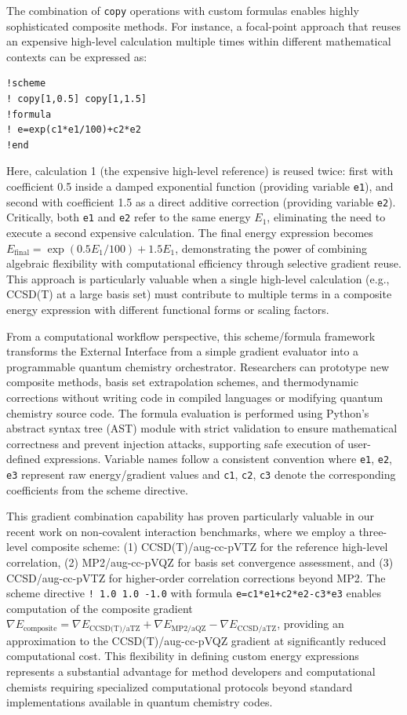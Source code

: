 The combination of \texttt{copy} operations with custom formulas enables highly sophisticated composite methods. For instance, a focal-point approach that reuses an expensive high-level calculation multiple times within different mathematical contexts can be expressed as:
\begin{verbatim}
!scheme
! copy[1,0.5] copy[1,1.5]
!formula
! e=exp(c1*e1/100)+c2*e2
!end
\end{verbatim}
Here, calculation 1 (the expensive high-level reference) is reused twice: first with coefficient 0.5 inside a damped exponential function (providing variable \texttt{e1}), and second with coefficient 1.5 as a direct additive correction (providing variable \texttt{e2}). Critically, both \texttt{e1} and \texttt{e2} refer to the same energy $E_1$, eliminating the need to execute a second expensive calculation. The final energy expression becomes $E_{\text{final}} = \exp(0.5 E_1 / 100) + 1.5 E_1$, demonstrating the power of combining algebraic flexibility with computational efficiency through selective gradient reuse. This approach is particularly valuable when a single high-level calculation (e.g., CCSD(T) at a large basis set) must contribute to multiple terms in a composite energy expression with different functional forms or scaling factors.

From a computational workflow perspective, this scheme/formula framework transforms the External Interface from a simple gradient evaluator into a programmable quantum chemistry orchestrator. Researchers can prototype new composite methods, basis set extrapolation schemes, and thermodynamic corrections without writing code in compiled languages or modifying quantum chemistry source code. The formula evaluation is performed using Python's abstract syntax tree (AST) module with strict validation to ensure mathematical correctness and prevent injection attacks, supporting safe execution of user-defined expressions. Variable names follow a consistent convention where \texttt{e1}, \texttt{e2}, \texttt{e3} represent raw energy/gradient values and \texttt{c1}, \texttt{c2}, \texttt{c3} denote the corresponding coefficients from the scheme directive.

This gradient combination capability has proven particularly valuable in our recent work on non-covalent interaction benchmarks, where we employ a three-level composite scheme: (1) CCSD(T)/aug-cc-pVTZ for the reference high-level correlation, (2) MP2/aug-cc-pVQZ for basis set convergence assessment, and (3) CCSD/aug-cc-pVTZ for higher-order correlation corrections beyond MP2. The scheme directive \texttt{! 1.0 1.0 -1.0} with formula \texttt{e=c1*e1+c2*e2-c3*e3} enables computation of the composite gradient $\nabla E_{\text{composite}} = \nabla E_{\text{CCSD(T)/aTZ}} + \nabla E_{\text{MP2/aQZ}} - \nabla E_{\text{CCSD/aTZ}}$, providing an approximation to the CCSD(T)/aug-cc-pVQZ gradient at significantly reduced computational cost. This flexibility in defining custom energy expressions represents a substantial advantage for method developers and computational chemists requiring specialized computational protocols beyond standard implementations available in quantum chemistry codes.
